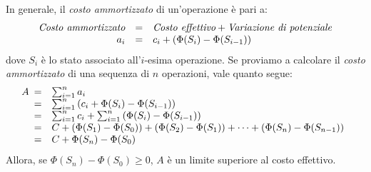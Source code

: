 \bigskip\noindent
In generale, il \emph{costo ammortizzato} di un'operazione è pari a:
\[\begin{array}[t]{rcl}
    \emph{Costo ammortizzato} & = & \emph{Costo effettivo}+\emph{Variazione di potenziale}\\
    a_i & = & c_i + (\Phi(S_i)-\Phi(S_{i-1}))
\end{array}\]
dove $S_i$ è lo stato associato all'$i$-esima operazione.
Se proviamo a calcolare il \emph{costo ammortizzato} di una sequenza di $n$
operazioni, vale quanto segue:
\[A\begin{array}[t]{cl}
    = & \sum_{i=1}^na_i\\
    = & \sum_{i=1}^n\left(c_i+\Phi(S_i)-\Phi(S_{i-1})\right)\\
    = & \sum_{i=1}^nc_i+\sum_{i=1}^n\left(\Phi(S_i)-\Phi(S_{i-1})\right)\\
    = & C + \left(\Phi(S_1) - \Phi(S_{0})\right) + \left(\Phi(S_2) - \Phi(S_1)\right)+\dots+\left(\Phi(S_n)-\Phi(S_{n-1})\right)\\
    = & C + \Phi(S_n) - \Phi(S_0)
\end{array}\]
Allora, se $\Phi(S_n)-\Phi(S_0)\geq0$, $A$ è un limite superiore al costo effettivo.

